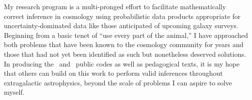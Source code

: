 My research program is a multi-pronged effort to facilitate mathematically correct inference in cosmology using probabilistic data products appropriate for uncertainty-dominated data like those anticipated of upcoming galaxy surveys.
Beginning from a basic tenet of ``use every part of the animal,'' I have approached both problems that have been known to the cosmology community for years and those that had not yet been identified as such but nonetheless deserved solutions.
In producing the \qp\ and \chippr\ public codes as well as pedagogical texts, it is my hope that others can build on this work to perform valid inferences throughout extragalactic astrophysics, beyond the scale of problems I can aspire to solve myself.

